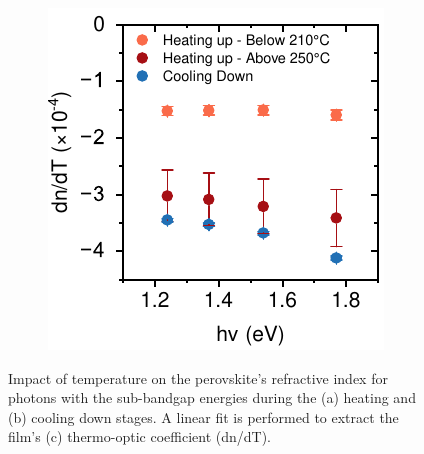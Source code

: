 \begin{figure}[htbp]
\begin{subfigure}{0.32\textwidth}
        \caption{}
        \label{fig:ellipsometry:thermooptic_cooling}
    \end{subfigure}
    \hfill
    \begin{subfigure}{0.3\textwidth}
        \includegraphics[width=\textwidth]{chapters/ellipsometry/image/Thermo-optic_Coefficient_energy.pdf}
        \caption{}
        \label{fig:ellipsometry:thermooptic_energy}
    \end{subfigure}
    \caption{Impact of temperature on the perovskite's refractive index for photons with the sub-bandgap energies during the (a) heating and (b) cooling down stages. A linear fit is performed to extract the film's (c) thermo-optic coefficient (dn/dT).}
    \label{fig:ellipsometry:thermooptic}
\end{figure}

